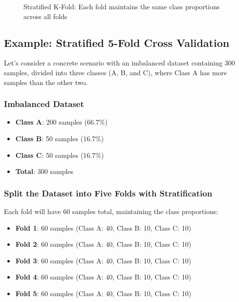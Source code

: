 \documentclass[11pt,a4paper]{article}
\theoremstyle{definition}
\theoremstyle{plain}
\theoremstyle{remark}
\begin{document}
\begin{figure}[h]
\caption{Stratified K-Fold: Each fold maintains the same class proportions across all folds}
\end{figure}

\subsection{Example: Stratified 5-Fold Cross Validation}

Let's consider a concrete scenario with an imbalanced dataset containing 300 samples, divided into three classes (A, B, and C), where Class A has more samples than the other two.

\subsubsection{Imbalanced Dataset}

\begin{itemize}
    \item \textbf{Class A}: 200 samples (66.7\%)
    \item \textbf{Class B}: 50 samples (16.7\%)
    \item \textbf{Class C}: 50 samples (16.7\%)
    \item \textbf{Total}: 300 samples
\end{itemize}

\subsubsection{Split the Dataset into Five Folds with Stratification}

Each fold will have 60 samples total, maintaining the class proportions:

\begin{itemize}
    \item \textbf{Fold 1}: 60 samples (Class A: 40, Class B: 10, Class C: 10)
    \item \textbf{Fold 2}: 60 samples (Class A: 40, Class B: 10, Class C: 10)
    \item \textbf{Fold 3}: 60 samples (Class A: 40, Class B: 10, Class C: 10)
    \item \textbf{Fold 4}: 60 samples (Class A: 40, Class B: 10, Class C: 10)
    \item \textbf{Fold 5}: 60 samples (Class A: 40, Class B: 10, Class C: 10)
\end{itemize}
\end{document}
